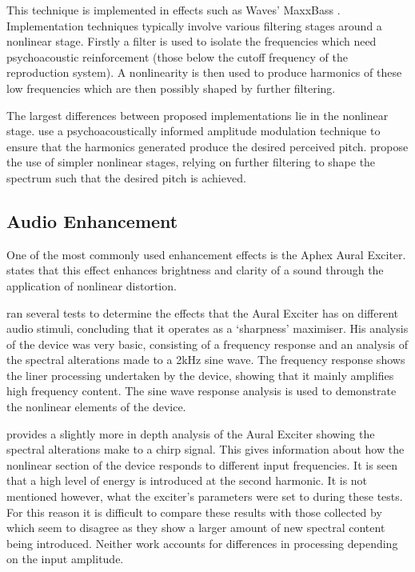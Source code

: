 		This technique is implemented in effects such as Waves' MaxxBass \citep{ben-tzur1999the}. Implementation
		techniques typically involve various filtering stages around a nonlinear stage. Firstly a filter is
		used to isolate the frequencies which need psychoacoustic reinforcement (those below the cutoff
		frequency of the reproduction system). A nonlinearity is then used to produce harmonics of these low
		frequencies which are then possibly shaped by further filtering. 
		
		The largest differences between proposed implementations lie in the nonlinear stage. \citet{gan2001virtual}
		use a psychoacoustically informed amplitude modulation technique to ensure that the harmonics generated
		produce the desired perceived pitch. \citet{larsen2002reproducing} propose the use of simpler nonlinear
		stages, relying on further filtering to shape the spectrum such that the desired pitch is achieved.


	\subsection{Audio Enhancement}
	\label{sec:Excitation-Uses-Enhancement}
		One of the most commonly used enhancement effects is the Aphex Aural Exciter. \citet{shekar2013modeling}
		states that this effect enhances brightness and clarity of a sound through the application of nonlinear
		distortion.

		\citet{chalupper2000aural} ran several tests to determine the effects that the Aural Exciter has on
		different audio stimuli, concluding that it operates as a `sharpness' maximiser. His analysis of the device
		was very basic, consisting of a frequency response and an analysis of the spectral alterations made to a
		2kHz sine wave. The frequency response shows the liner processing undertaken by the device, showing that it
		mainly amplifies high frequency content. The sine wave response analysis is used to demonstrate the
		nonlinear elements of the device. 

		\citet{dutilleux2011nonlinear} provides a slightly more in depth analysis of the Aural Exciter showing the
		spectral alterations make to a chirp signal. This gives information about how the nonlinear section of the
		device responds to different input frequencies. It is seen that a high level of energy is introduced at the
		second harmonic. It is not mentioned however, what the exciter's parameters were set to during these tests.
		For this reason it is difficult to compare these results with those collected by \citet{chalupper2000aural}
		which seem to disagree as they show a larger amount of new spectral content being introduced. Neither work
		accounts for differences in processing depending on the input amplitude.

